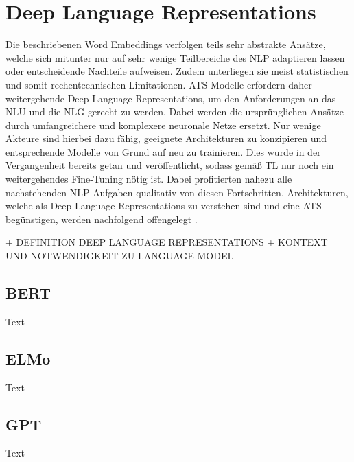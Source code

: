 \section{Deep Language Representations}
\noindent
Die beschriebenen Word Embeddings verfolgen teils sehr abstrakte Ansätze, welche sich mitunter nur auf sehr wenige Teilbereiche des \ac{NLP} adaptieren lassen oder entscheidende Nachteile aufweisen. Zudem unterliegen sie meist statistischen und somit rechentechnischen Limitationen. \ac{ATS}-Modelle erfordern daher weitergehende Deep Language Representations, um den Anforderungen an das \ac{NLU} und die \ac{NLG} gerecht zu werden. Dabei werden die ursprünglichen Ansätze durch umfangreichere und komplexere neuronale Netze ersetzt. Nur wenige Akteure sind hierbei dazu fähig, geeignete Architekturen zu konzipieren und entsprechende Modelle von Grund auf neu zu trainieren. Dies wurde in der Vergangenheit bereits getan und veröffentlicht, sodass gemäß \ac{TL} nur noch ein weitergehendes Fine-Tuning nötig ist. Dabei profitierten nahezu alle nachstehenden \ac{NLP}-Aufgaben qualitativ von diesen Fortschritten. Architekturen, welche als Deep Language Representations zu verstehen sind und eine \ac{ATS} begünstigen, werden nachfolgend offengelegt \cite[S.~25]{NIT19}.

+ DEFINITION DEEP LANGUAGE REPRESENTATIONS
+ KONTEXT UND NOTWENDIGKEIT ZU LANGUAGE MODEL


\subsection{BERT}
\noindent
Text

\subsection{ELMo}
\noindent
Text

\subsection{GPT}
\noindent
Text


